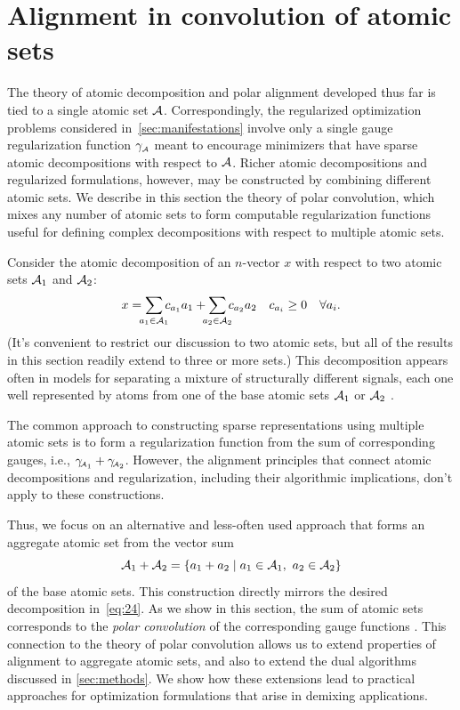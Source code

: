 \section{Alignment in convolution of atomic sets}

The theory of atomic decomposition and polar alignment developed thus far is
tied to a single atomic set $\mathcal{A}$. Correspondingly, the regularized
optimization problems considered in~\autoref{sec:manifestations} involve only a
single gauge regularization function $\gamma_{\scriptscriptstyle\mathcal{A}}$ meant to encourage minimizers
that have sparse atomic decompositions with respect to $\mathcal{A}$.  Richer atomic
decompositions and regularized formulations, however, may be constructed by
combining different atomic sets. We describe in this section the theory of polar
convolution, which mixes any number of atomic sets to form computable
regularization functions useful for defining complex decompositions with respect
to multiple atomic sets.

Consider the atomic decomposition of an $n$-vector $x$ with respect to two
atomic sets $\mathcal{A}_1$ and $\mathcal{A}_2$:
\begin{equation} \label{eq:24}
  x =   \sum_{\mathclap{a_1\in\Ascr_1}}c_{a_1}a_1 
      + \sum_{\mathclap{a_2\in\Ascr_2}}c_{a_2}a_2
       \quad c_{a_i}\ge0 \quad \forall a_i.
\end{equation}
(It's convenient to restrict our discussion to two atomic sets, but all of the
results in this section readily extend to three or more sets.) This
decomposition appears often in models for separating a mixture of structurally
different signals, each one well represented by atoms from one of the base
atomic sets $\mathcal{A}_1$ or $\mathcal{A}_2$
\citep{wright2009robust,candes2011robust,wright2013compressive,McCoy2014,oymak2017universality,donoho2012sparse}.

The common approach to constructing sparse representations using multiple atomic
sets is to form a regularization function from the sum of corresponding gauges,
i.e., $\gamma_{\!\scriptscriptstyle\mathcal{A}_1}+\gamma_{\!\scriptscriptstyle\mathcal{A}_2}$. However, the alignment principles that connect
atomic decompositions and regularization, including their algorithmic
implications, don't apply to these constructions.

Thus, we focus on an alternative and less-often used approach that forms an
aggregate atomic set from the vector sum
\begin{equation*} \label{eq:23}
  \Ascr_1+\Ascr_2 = \{a_1+a_2 \mid a_1\in\Ascr_1,\ a_2\in\Ascr_2\}
\end{equation*}
of the base atomic sets. This construction directly mirrors the desired
decomposition in~\eqref{eq:24}. As we show in this section, the sum of atomic
sets corresponds to the \emph{polar convolution} of the corresponding gauge
functions \cite{friedlander2019polarconvolution}. This connection to the theory of
polar convolution allows us to extend properties of alignment to aggregate
atomic sets, and also to extend the dual algorithms discussed in
\autoref{sec:methods}. We show how these extensions lead to practical approaches
for optimization formulations that arise in demixing applications.

